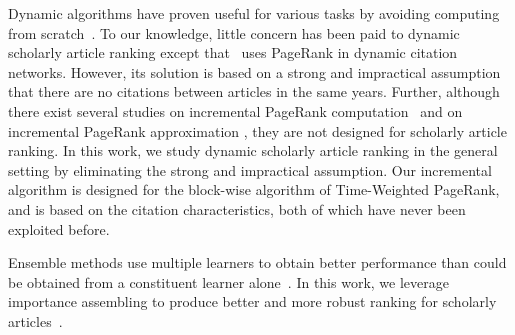 Dynamic algorithms have proven useful for various tasks by avoiding computing from scratch~\cite{RamalingamR93}.
To our knowledge, little concern has been paid to dynamic scholarly article ranking except that~\cite{GhoshKHLL11} uses PageRank in dynamic citation networks. However, its solution is based on a strong and impractical assumption that there are no citations between articles in the same years.
Further, although there exist several studies on incremental PageRank computation~\cite{DesikanPSK05,AbiteboulPC03,WuR09} and on incremental PageRank approximation \cite{BahmaniCG10,BahmaniKMU12}, they are not designed for scholarly article ranking.
%
In this work, we study dynamic scholarly article ranking in the general setting by eliminating the strong and impractical assumption. Our incremental algorithm is designed for the block-wise algorithm of Time-Weighted PageRank, and is based on the citation characteristics, both of which have never been exploited before.


Ensemble methods use multiple learners to obtain better performance than could be obtained from a constituent learner alone~\cite{zhihua-book}.
In this work, we leverage  importance assembling  to produce better and more robust ranking for scholarly articles~\cite{zhihua-book,wsdmcup,DuanAMHH16}.

